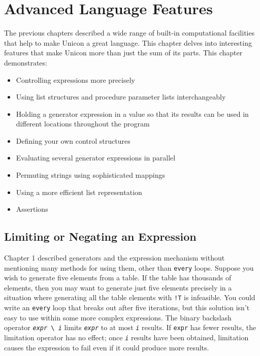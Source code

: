 \chapter{Advanced Language Features}

The previous chapters described a wide range of built-in computational
facilities that help to make Unicon a great language.
This chapter delves into interesting features that make Unicon
more than just the sum of its parts. This chapter demonstrates:

\begin{itemize}\itemsep0pt
\item Controlling expressions more precisely
\item Using list structures and procedure parameter lists
interchangeably
\item Holding a generator expression in a value so that
its results can be used in different locations throughout the program
\item Defining your own control structures
\item Evaluating several generator expressions in parallel
\item Permuting strings using sophisticated mappings
\item Using a more efficient list representation
\item Assertions
\end{itemize}

\section{Limiting or Negating an Expression}

Chapter 1 described generators and the
expression mechanism without mentioning many methods for using them,
other than \texttt{every} loops. Suppose you wish to generate five
elements from a table. If the table has thousands of elements, then you
may want to generate just five elements precisely in a situation where
generating all the table elements with \texttt{!T} is infeasible. You
could write an \texttt{every} loop that breaks out after five
iterations, but this solution isn't easy to use within
some more complex expressions. The binary backslash operator
\texttt{\textit{expr}}\texttt{ {\textbackslash} }\texttt{\textit{i}}
limits \texttt{\textit{expr}} to at most \texttt{\textit{i}} results.
If \texttt{expr} has fewer results, the limitation operator has no
effect; once \texttt{\textit{i}} results have been obtained, limitation
causes the expression to fail even if it
could produce more results.

